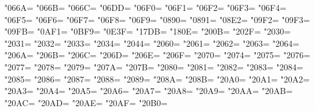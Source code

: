 \XeTeXcharclass"066A=\KclassNum
\XeTeXcharclass"066B=\KclassNum
\XeTeXcharclass"066C=\KclassNum
\XeTeXcharclass"06DD=\KclassNum
\XeTeXcharclass"06F0=\KclassNum
\XeTeXcharclass"06F1=\KclassNum
\XeTeXcharclass"06F2=\KclassNum
\XeTeXcharclass"06F3=\KclassNum
\XeTeXcharclass"06F4=\KclassNum
\XeTeXcharclass"06F5=\KclassNum
\XeTeXcharclass"06F6=\KclassNum
\XeTeXcharclass"06F7=\KclassNum
\XeTeXcharclass"06F8=\KclassNum
\XeTeXcharclass"06F9=\KclassNum
\XeTeXcharclass"0890=\KclassNum
\XeTeXcharclass"0891=\KclassNum
\XeTeXcharclass"08E2=\KclassNum
\XeTeXcharclass"09F2=\KclassNum
\XeTeXcharclass"09F3=\KclassNum
\XeTeXcharclass"09FB=\KclassNum
\XeTeXcharclass"0AF1=\KclassNum
\XeTeXcharclass"0BF9=\KclassNum
\XeTeXcharclass"0E3F=\KclassNum
\XeTeXcharclass"17DB=\KclassNum
\XeTeXcharclass"180E=\KclassNum
\XeTeXcharclass"200B=\KclassNum
\XeTeXcharclass"202F=\KclassNum
\XeTeXcharclass"2030=\KclassNum
\XeTeXcharclass"2031=\KclassNum
\XeTeXcharclass"2032=\KclassNum
\XeTeXcharclass"2033=\KclassNum
\XeTeXcharclass"2034=\KclassNum
\XeTeXcharclass"2044=\KclassNum
\XeTeXcharclass"2060=\KclassNum
\XeTeXcharclass"2061=\KclassNum
\XeTeXcharclass"2062=\KclassNum
\XeTeXcharclass"2063=\KclassNum
\XeTeXcharclass"2064=\KclassNum
\XeTeXcharclass"206A=\KclassNum
\XeTeXcharclass"206B=\KclassNum
\XeTeXcharclass"206C=\KclassNum
\XeTeXcharclass"206D=\KclassNum
\XeTeXcharclass"206E=\KclassNum
\XeTeXcharclass"206F=\KclassNum
\XeTeXcharclass"2070=\KclassNum
\XeTeXcharclass"2074=\KclassNum
\XeTeXcharclass"2075=\KclassNum
\XeTeXcharclass"2076=\KclassNum
\XeTeXcharclass"2077=\KclassNum
\XeTeXcharclass"2078=\KclassNum
\XeTeXcharclass"2079=\KclassNum
\XeTeXcharclass"207A=\KclassNum
\XeTeXcharclass"207B=\KclassNum
\XeTeXcharclass"2080=\KclassNum
\XeTeXcharclass"2081=\KclassNum
\XeTeXcharclass"2082=\KclassNum
\XeTeXcharclass"2083=\KclassNum
\XeTeXcharclass"2084=\KclassNum
\XeTeXcharclass"2085=\KclassNum
\XeTeXcharclass"2086=\KclassNum
\XeTeXcharclass"2087=\KclassNum
\XeTeXcharclass"2088=\KclassNum
\XeTeXcharclass"2089=\KclassNum
\XeTeXcharclass"208A=\KclassNum
\XeTeXcharclass"208B=\KclassNum
\XeTeXcharclass"20A0=\KclassNum
\XeTeXcharclass"20A1=\KclassNum
\XeTeXcharclass"20A2=\KclassNum
\XeTeXcharclass"20A3=\KclassNum
\XeTeXcharclass"20A4=\KclassNum
\XeTeXcharclass"20A5=\KclassNum
\XeTeXcharclass"20A6=\KclassNum
\XeTeXcharclass"20A7=\KclassNum
\XeTeXcharclass"20A8=\KclassNum
\XeTeXcharclass"20A9=\KclassNum
\XeTeXcharclass"20AA=\KclassNum
\XeTeXcharclass"20AB=\KclassNum
\XeTeXcharclass"20AC=\KclassNum
\XeTeXcharclass"20AD=\KclassNum
\XeTeXcharclass"20AE=\KclassNum
\XeTeXcharclass"20AF=\KclassNum
\XeTeXcharclass"20B0=\KclassNum
